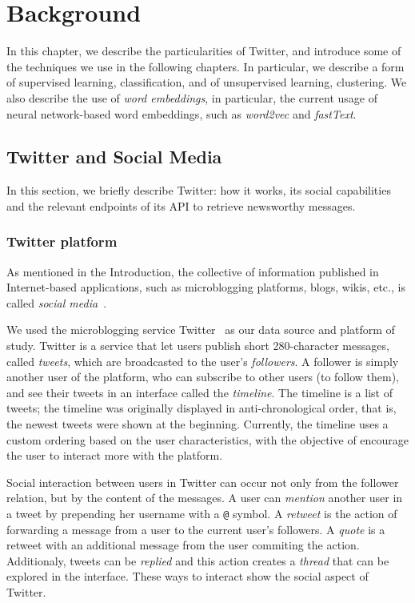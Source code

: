 
\chapter{Background}
\label{chapter:background}

In this chapter, we describe the particularities of Twitter, and introduce some
of the techniques we use in the following chapters. 
%
In particular, we describe a form of supervised learning, classification, and of
unsupervised learning, clustering.
%
We also describe the use of {\em word embeddings}, in particular, the current
usage of neural network-based word embeddings, such as {\em word2vec} and {\em
fastText}.

\section{Twitter and Social Media}

In this section, we briefly describe Twitter: how it works, its social
capabilities and the relevant endpoints of its API to retrieve newsworthy
messages.

\subsection{Twitter platform}

As mentioned in the Introduction, the collective of information published in
Internet-based applications, such as microblogging platforms, blogs, wikis,
etc., is called {\em social media}~\cite{kaplan2010users}.


We used the microblogging service Twitter~\cite{twitter} as our data source and
platform of study.
%
Twitter is a service that let users publish short 280-character messages, called
{\em tweets}, which are broadcasted to the user's {\em followers}.
%
A follower is simply another user of the platform, who can subscribe to other
users (to follow them), and see their tweets in an interface called the {\em
timeline}.
%
The timeline is a list of tweets; the timeline was originally displayed in
anti-chronological order, that is, the newest tweets were shown at the
beginning.
%
Currently, the timeline uses a custom ordering based on the user
characteristics, with the objective of encourage the user to interact more with
the platform.

Social interaction between users in Twitter can occur not only from the follower
relation, but by the content of the messages.
%
A user can {\em mention} another user in a tweet by prepending her username with
a {\tt @} symbol.
%
A {\em retweet} is the action of forwarding a message from a user to the current
user's followers.
%
A {\em quote} is a retweet with an additional message from the user commiting
the action.
%
Additionaly, tweets can be {\em replied} and this action creates a {\em thread}
that can be explored in the interface.
%
These ways to interact show the social aspect of Twitter.

